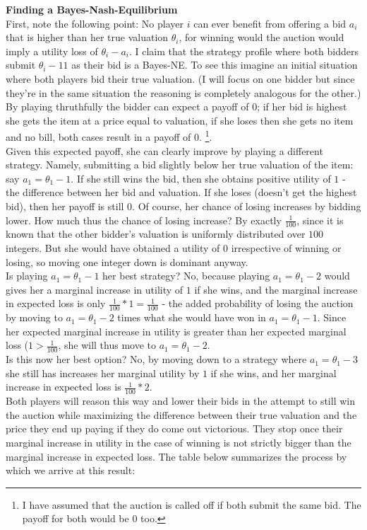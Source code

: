 \documentclass[10pt,a4paper]{article}
\begin{document}
\textbf{Finding a Bayes-Nash-Equilibrium}\\
First, note the following point: No player $i$ can ever benefit from offering a bid $a_i$ that is higher than her true valuation $\theta_i$, for winning would the auction would imply a utility loss of $\theta_i - a_i$. I claim that the strategy profile where both bidders submit $\theta_i - 11$ as their bid is a Bayes-NE. To see this imagine an initial situation where both players bid their true valuation. (I will focus on one bidder but since they're in the same situation the reasoning is completely analogous for the other.) \\
By playing thruthfully the bidder can expect a payoff of $0$; if her bid is highest she gets the item at a price equal to valuation, if she loses then she gets no item and no bill, both cases result in a payoff of $0$. \footnote{I have assumed that the auction is called off if both submit the same bid. The payoff for both would be $0$ too.}. \\
Given this expected payoff, she can clearly improve by playing a different strategy. Namely, submitting a bid slightly below her true valuation of the item: say $a_1=\theta_1-1$. If she still wins the bid, then she obtains positive utility of $1$ - the difference between her bid and valuation. If she loses (doesn't get the highest bid), then her payoff is still $0$. Of course, her chance of losing increases by bidding lower. How much thus the chance of losing increase? By exactly $\tfrac{1}{100}$, since it is known that the other bidder's valuation is uniformly distributed over $100$ integers. But she would have obtained a utility of $0$ irrespective of winning or losing, so moving one integer down is dominant anyway.\\
Is playing $a_1=\theta_1-1$ her best strategy? No, because playing $a_1=\theta_1-2$ would gives her a marginal increase in utility of $1$ if she wins, and the marginal increase in expected loss is only $\tfrac{1}{100}*1=\tfrac{1}{100}$ - the added probability of losing the auction by moving to $a_1=\theta_1-2$ times what she would have won in $a_1=\theta_1-1$. Since her expected marginal increase in utility is greater than her expected marginal loss ($1>\tfrac{1}{100}$, she will thus move to $a_1=\theta_1-2$.\\
 Is this now her best option? No, by moving down to a strategy where $a_1=\theta_1-3$ she still has increases her marginal utility by $1$ if she wins, and her marginal increase in expected loss is $\tfrac{1}{100}*2$.\\
Both players will reason this way and lower their bids in the attempt to still win the auction while maximizing the difference between their true valuation and the price they end up paying if they do come out victorious. They stop once their marginal increase in utility in the case of winning is not strictly bigger than the marginal increase in expected loss. The table below summarizes the process by which we arrive at this result:
\end{document}
